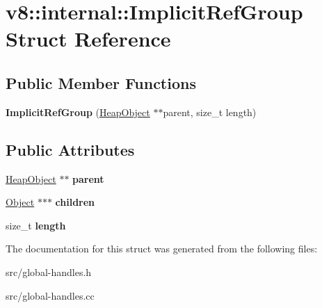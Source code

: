 \hypertarget{structv8_1_1internal_1_1_implicit_ref_group}{}\section{v8\+:\+:internal\+:\+:Implicit\+Ref\+Group Struct Reference}
\label{structv8_1_1internal_1_1_implicit_ref_group}
\subsection*{Public Member Functions}
\begin{DoxyCompactItemize}
\item 
\hypertarget{structv8_1_1internal_1_1_implicit_ref_group_a7b3cbfad70befcb621a04f53bf4d46e3}{}{\bfseries Implicit\+Ref\+Group} (\hyperlink{classv8_1_1internal_1_1_heap_object}{Heap\+Object} $\ast$$\ast$parent, size\+\_\+t length)\label{structv8_1_1internal_1_1_implicit_ref_group_a7b3cbfad70befcb621a04f53bf4d46e3}

\end{DoxyCompactItemize}
\subsection*{Public Attributes}
\begin{DoxyCompactItemize}
\item 
\hypertarget{structv8_1_1internal_1_1_implicit_ref_group_afdc019f1a6914fe8e30340bff29b3351}{}\hyperlink{classv8_1_1internal_1_1_heap_object}{Heap\+Object} $\ast$$\ast$ {\bfseries parent}\label{structv8_1_1internal_1_1_implicit_ref_group_afdc019f1a6914fe8e30340bff29b3351}

\item 
\hypertarget{structv8_1_1internal_1_1_implicit_ref_group_a963f060bdc11f2a0e9b9f4b6ce2940b4}{}\hyperlink{classv8_1_1internal_1_1_object}{Object} $\ast$$\ast$$\ast$ {\bfseries children}\label{structv8_1_1internal_1_1_implicit_ref_group_a963f060bdc11f2a0e9b9f4b6ce2940b4}

\item 
\hypertarget{structv8_1_1internal_1_1_implicit_ref_group_a94a3a7261fa8c21ca2942a907b5f917c}{}size\+\_\+t {\bfseries length}\label{structv8_1_1internal_1_1_implicit_ref_group_a94a3a7261fa8c21ca2942a907b5f917c}

\end{DoxyCompactItemize}


The documentation for this struct was generated from the following files\+:\begin{DoxyCompactItemize}
\item 
src/global-\/handles.\+h\item 
src/global-\/handles.\+cc\end{DoxyCompactItemize}
